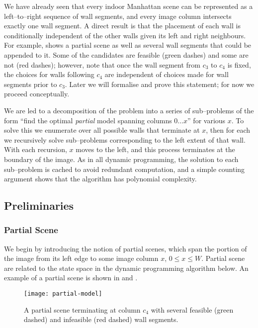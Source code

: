 We have already seen that every indoor Manhattan scene can be
represented as a left--to--right sequence of wall segments, and every
image column intersects exactly one wall segment. A direct result is
that the placement of each wall is conditionally independent of the
other walls given its left and right neighbours. For example,
 shows a partial scene as well as several wall
segments that could be appended to it. Some of the candidates are
feasible (green dashes) and some are not (red dashes); however, note
that once the wall segment from $c_3$ to $c_4$ is fixed, the choices
for walls following $c_4$ are independent of choices made for wall
segments prior to $c_3$. Later we will formalise and prove this
statement; for now we proceed conceptually.

We are led to a decomposition of the problem into a series of
sub--problems of the form ``find the optimal \textit{partial} model
spanning columns $0 \ldots x$'' for various $x$. To solve this we
enumerate over all possible walls that terminate at $x$, then for each
we recursively solve sub--problems corresponding to the left extent of
that wall. With each recursion, $x$ moves to the left, and this
process terminates at the boundary of the image. As in all dynamic
programming, the solution to each sub--problem is cached to avoid
redundant computation, and a simple counting argument shows that the
algorithm has polynomial complexity.

\subsection{Preliminaries}
\label{sect:preliminaries}

\subsubsection{Partial Scene}

We begin by introducing the notion of partial scenes, which span the
portion of the image from its left edge to some image column $x$, $0
\leq x \leq W$. Partial scene are related to the state space in the
dynamic programming algorithm below. An example of a partial scene is
shown in  and .

\begin{figure}[tb]
  \centering
  \texttt{[image: partial-model]}
  \caption{A partial scene terminating at column $c_4$ with several
    feasible (green dashed) and infeasible (red dashed) wall
    segments.}
  \label{fig:partial-scene}
\end{figure}


